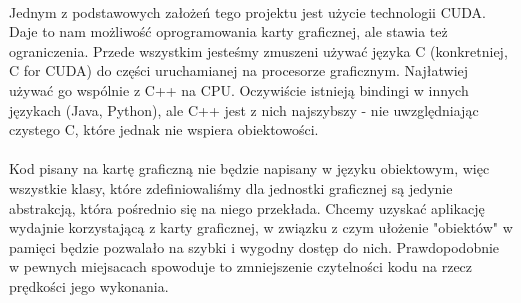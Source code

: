 \paragraph{}

Jednym z podstawowych założeń tego projektu jest użycie technologii CUDA. Daje to nam możliwość oprogramowania karty graficznej, ale stawia też ograniczenia. Przede wszystkim jesteśmy zmuszeni używać języka C (konkretniej, C for CUDA) do części uruchamianej na procesorze graficznym. Najłatwiej używać go wspólnie z C++ na CPU. Oczywiście istnieją bindingi w innych językach (Java, Python), ale C++ jest z nich najszybszy - nie uwzględniając czystego C, które jednak nie wspiera obiektowości. 

\paragraph{}

Kod pisany na kartę graficzną nie będzie napisany w języku obiektowym, więc wszystkie klasy, które zdefiniowaliśmy dla jednostki graficznej są jedynie abstrakcją, która pośrednio się na niego przekłada. Chcemy uzyskać aplikację wydajnie korzystającą z karty graficznej, w związku z czym ułożenie "obiektów" w pamięci będzie pozwalało na szybki i wygodny dostęp do nich. Prawdopodobnie w pewnych miejsacach spowoduje to zmniejszenie czytelności kodu na rzecz prędkości jego wykonania.
